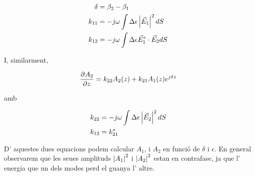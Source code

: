 \begin{subequations}
  \begin{align}
    \delta &= \beta_2 - \beta_1 \nonumber \\
    k_{11} &= -j \omega \int \Delta \epsilon \left\rvert \vec E_1 \right\lvert ^2 dS \nonumber \\
    k_{12}& = -j \omega \int \Delta \epsilon \vec E_1 ^* \cdot \vec E_2 dS \nonumber \\
  \end{align}
\end{subequations}

I, similarment,

\begin{equation}
  \frac{\partial ^{} A_2}{\partial z ^{}} = k_{22} A_2 (z) + k_{21} A_1(z) e^{j \delta z}
\end{equation}

amb

\begin{subequations}
  \begin{align}
    k_{22} &= -j \omega \int \Delta \epsilon \left\rvert \vec E_2 \right\lvert ^2 dS \nonumber \\
    k_{12} &= k_{21}^* \nonumber \\
  \end{align}
\end{subequations}

D' aquestes dues equacions podem calcular $A_1$, i $A_2$ en funció de $\delta$ i $\epsilon$. En general observarem que les seues amplituds $\left\rvert A_1 \right\lvert^2$ i $\left\rvert A_2 \right\lvert ^2$ estan en contrafase, ja que l' energia que un dels modes perd el guanya l' altre.